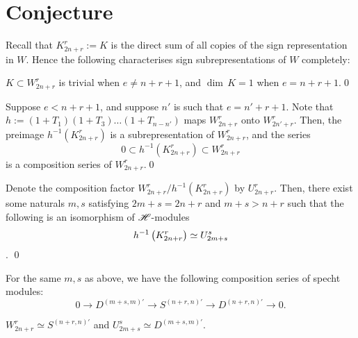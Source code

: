 \documentclass{amsart}
\begin{document}
\section{Conjecture}
Recall that $K_{2n + r}^r := K$ is the direct sum of all copies of the sign representation in $W$.
Hence the following characterises sign subrepresentations of $W$ completely:
\begin{proposition}
  $K \subset W_{2n + r}^r$ is trivial when $e \neq n + r + 1$, and $\dim \, K = 1$ when $e = n + r + 1$.\qed
\end{proposition} 
\begin{proposition}
  Suppose $e < n + r + 1$, and suppose $n'$ is such that $e = n' + r + 1$.
  Note that $h := (1 + T_1)(1 + T_3)\dots(1 + T_{n - n'})$ maps $W_{2n + r}^r$ onto $W_{2n' + r}^r$.
  Then, the preimage $h^{-1}(K_{2n + r}^r)$ is a subrepresentation of $W_{2n + r}^r$, and the series
  \[
    0 \subset h^{-1}(K_{2n + r}^r) \subset W_{2n + r}^r
  \]
  is a composition series of $W_{2n + r}^r$.\qed
\end{proposition}
\begin{proposition}
  Denote the composition factor $W_{2n + r}^r / h^{-1}(K_{2n + r}^r)$ by $U_{2n + r}^r$.
  Then, there exist some naturals $m,s$ satisfying $2m + s = 2n + r$ and $m + s > n + r$ such that the following is an isomorphism of $\mathscr{H}$-modules \[h^{-1}\left( K_{2n + r}^r \right) \simeq U_{2m + s}^s\].
  \qed
\end{proposition}
\begin{proposition}
  For the same $m,s$ as above, we have the following composition series of specht modules:
  \[
    0 \longrightarrow D^{(m+s,m)'} \longrightarrow S^{(n+r,n)'} \longrightarrow D^{(n+r,n)'} \longrightarrow 0.
  \]
\end{proposition}
\begin{proposition}
  $W_{2n + r}^r \simeq S^{(n+r,n)'}$ and $U_{2m +s}^s \simeq D^{(m+s,m)'}$.
\end{proposition}

\newpage

\appendix
\end{document}
